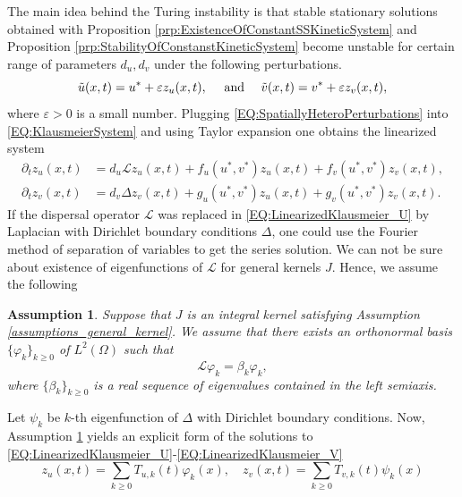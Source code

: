 \documentclass[11pt, a4paper]{article}
\theoremstyle{break}
\theoremstyle{break}
\theoremstyle{break}
\newtheorem{asm}{Assumption}[section]
\theoremstyle{break}
\theoremstyle{break}
\theoremstyle{break}
\theoremstyle{break}
\theoremstyle{break}
\theoremstyle{break}
\theoremstyle{break}
\begin{document}
The main idea behind the Turing instability is that stable stationary solutions obtained with Proposition \ref{prp:ExistenceOfConstantSSKineticSystem} and Proposition \ref{prp:StabilityOfConstanstKineticSystem} become unstable for certain range of parameters $d_u, d_v$ under the following perturbations.
\begin{equation}
    \label{EQ:SpatiallyHeteroPerturbations}
    \Tilde{u}(x,t) = u^* + \varepsilon z_u(x, t), \quad \text{ and } \quad \Tilde{v}(x,t) = v^* + \varepsilon z_v(x, t),
\end{equation}
where $\varepsilon > 0$ is a small number. Plugging \eqref{EQ:SpatiallyHeteroPerturbations} into \eqref{EQ:KlausmeierSystem} and using Taylor expansion one obtains the linearized system
\begin{align}
    \partial_t z_u(x, t) &= d_u \mathcal{L} z_u(x, t) + f_u(u^*, v^*) z_u(x, t) + f_v(u^*, v^*) z_v(x,t), \label{EQ:LinearizedKlausmeier_U}\\
    \partial_t z_v(x, t) &= d_v \Delta z_v(x, t) + g_u(u^*, v^*) z_u(x, t) + g_v(u^*, v^*) z_v(x,t). \label{EQ:LinearizedKlausmeier_V}
\end{align}
If the dispersal operator $\mathcal{L}$ was replaced in \eqref{EQ:LinearizedKlausmeier_U} by Laplacian with Dirichlet boundary conditions $\Delta$, one could use the Fourier method of separation of variables to get the series solution. We can not be sure about existence of eigenfunctions of $\mathcal{L}$ for general kernels $J$. Hence, we assume the following
\begin{asm}
    \label{asm:eigenbasisforDispersal}
    Suppose that $J$ is an integral kernel satisfying Assumption \ref{assumptions_general_kernel}. We assume that there exists an orthonormal basis $\{ \varphi_k \}_{k \geq 0}$ of $L^2(\Omega)$ such that 
    \begin{equation}
        \mathcal{L} \varphi_k = \beta_k \varphi_k,
    \end{equation}
    where $\{ \beta_k \}_{k \geq 0}$ is a real sequence of eigenvalues contained in the left semiaxis.
\end{asm}
Let $\psi_k$ be $k$-th eigenfunction of $\Delta$ with Dirichlet boundary conditions. Now, Assumption \ref{asm:eigenbasisforDispersal} yields an explicit form of the solutions to \eqref{EQ:LinearizedKlausmeier_U}-\eqref{EQ:LinearizedKlausmeier_V}
\begin{equation}
    \label{EQ:FourierSeriesLinearizedProblem}
    z_u(x,t) = \sum_{k \geq 0} T_{u, k}(t) \varphi_k(x), \quad z_v(x,t) = \sum_{k \geq 0} T_{v, k}(t) \psi_k(x)
\end{equation}
\end{document}
